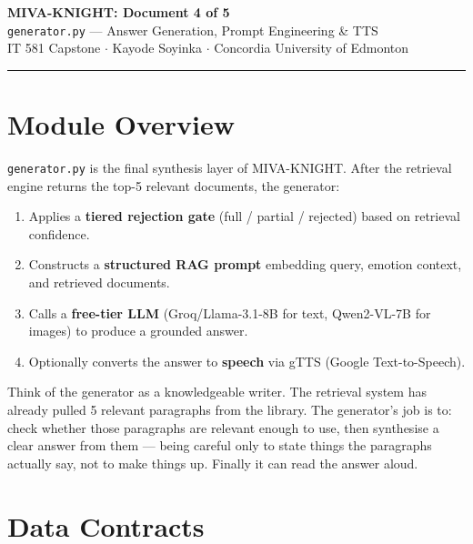 \documentclass[12pt,a4paper]{article}
\theoremstyle{definition}
\theoremstyle{plain}
\theoremstyle{remark}
\newcommand{\layman}[1]{\begin{tcolorbox}[laymanstyle]#1\end{tcolorbox}}
\begin{document}
\begin{center}
{\LARGE\bfseries\color{navy} MIVA-KNIGHT: Document 4 of 5}\\[0.5em]
{\Large \texttt{generator.py} — Answer Generation, Prompt Engineering \& TTS}\\[0.3em]
{\large IT 581 Capstone $\cdot$ Kayode Soyinka $\cdot$ Concordia University of Edmonton}
\end{center}
\hrule\vspace{1em}
\tableofcontents\newpage

\section{Module Overview}

\texttt{generator.py} is the final synthesis layer of MIVA-KNIGHT. After the retrieval engine returns the top-5 relevant documents, the generator:
\begin{enumerate}[noitemsep]
  \item Applies a \textbf{tiered rejection gate} (full / partial / rejected) based on retrieval confidence.
  \item Constructs a \textbf{structured RAG prompt} embedding query, emotion context, and retrieved documents.
  \item Calls a \textbf{free-tier LLM} (Groq/Llama-3.1-8B for text, Qwen2-VL-7B for images) to produce a grounded answer.
  \item Optionally converts the answer to \textbf{speech} via gTTS (Google Text-to-Speech).
\end{enumerate}

\layman{Think of the generator as a knowledgeable writer. The retrieval system has already pulled 5 relevant paragraphs from the library. The generator's job is to: check whether those paragraphs are relevant enough to use, then synthesise a clear answer from them — being careful only to state things the paragraphs actually say, not to make things up. Finally it can read the answer aloud.}

\section{Data Contracts}
\end{document}
